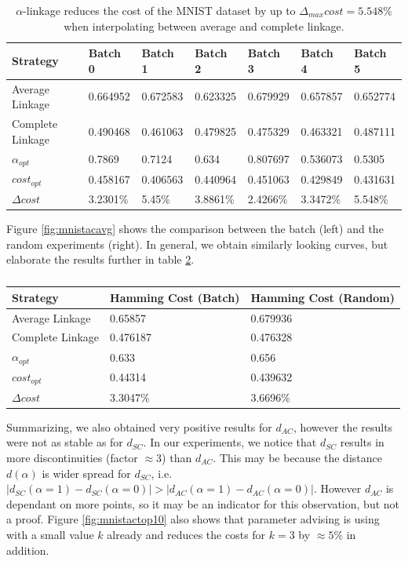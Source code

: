 \begin{table}[h]
    \centering
    \begin{tabular}{|l | l l l l l l |}
    \hline
    Strategy & Batch 0 & Batch 1 & Batch 2 & Batch 3 & Batch 4 & Batch 5\\ \hline
    Average Linkage & 0.664952 & 0.672583 & 0.623325 & 0.679929 & 0.657857 & 0.652774\\
    Complete Linkage & 0.490468 & 0.461063 & 0.479825 & 0.475329 & 0.463321 & 0.487111\\
    $\alpha_{opt}$ & 0.7869 & 0.7124 & 0.634 & 0.807697 & 0.536073 & 0.5305\\
    $cost_{opt}$ & 0.458167 & 0.406563 & 0.440964 & 0.451063 & 0.429849 & 0.431631\\
    $\Delta cost$ & 3.2301\% & 5.45\% & 3.8861\% & 2.4266\% & 3.3472\% & 5.548\%\\\hline
    \end{tabular}
    \caption{$\alpha$-linkage reduces the cost of the MNIST dataset by up to $\Delta_{max} cost = 5.548\%$ when interpolating between average and complete linkage.}
    \label{table:mnist1000acbatch}
\end{table}

Figure \ref{fig:mnistacavg} shows the comparison between the batch (left) and the random experiments (right). In general, we obtain similarly looking curves, but elaborate the results further in table \ref{table:mnistacavg}.

\begin{table}[h]
    \centering
    \begin{tabular}{|l | l | l |}
    \hline
    Strategy & Hamming Cost (Batch) & Hamming Cost (Random)\\ \hline
    Average Linkage & 0.65857 & 0.679936\\
    Complete Linkage & 0.476187 & 0.476328\\
    $\alpha_{opt}$ & 0.633 & 0.656\\
    $cost_{opt}$ & 0.44314 & 0.439632\\
    $\Delta cost$ & 3.3047\% & 3.6696\%\\\hline
    \end{tabular}
    \caption{}
    \label{table:mnistacavg}
\end{table}

Summarizing, we also obtained very positive results for $d_{AC}$, however the results were not as stable as for $d_{SC}$. In our experiments, we notice that $d_{SC}$ results in more discontinuities (factor $\approx 3$) than $d_{AC}$. This may be because the distance $d(\alpha)$ is wider spread for $d_{SC}$, i.e. $|d_{SC}(\alpha = 1) - d_{SC}(\alpha = 0)| > |d_{AC}(\alpha = 1) - d_{AC}(\alpha = 0)|$. However $d_{AC}$ is dependant on more points, so it may be an indicator for this observation, but not a proof. Figure \ref{fig:mnistactop10} also shows that parameter advising is using with a small value $k$ already and reduces the costs for $k = 3$ by $\approx 5\%$ in addition.

